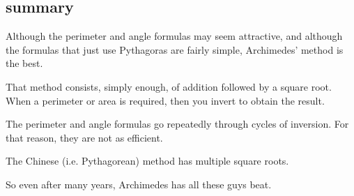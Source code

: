 \documentclass[11pt, oneside]{article}
\begin{document}
\subsection*{summary}

Although the perimeter and angle formulas may seem attractive, and although the formulas that just use Pythagoras are fairly simple, Archimedes' method is the best.

That method consists, simply enough, of addition followed by a square root.  When a perimeter or area is required, then you invert to obtain the result.

The perimeter and angle formulas go repeatedly through cycles of inversion.  For that reason, they are not as efficient.

The Chinese (i.e. Pythagorean) method has multiple square roots.

So even after many years, Archimedes has all these guys beat.
\end{document}
